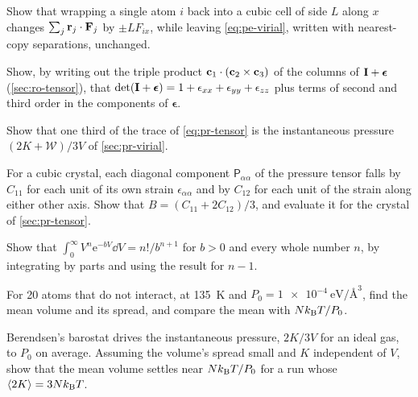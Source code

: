 \begin{exercise}
\label{ex:pr-wrap}
Show that wrapping a single atom $i$ back into a cubic cell of side $L$
along $x$ changes $\sum_j\bm{\mathrm{r}}_j\cdot\bm{\mathrm{F}}_j$ by $\pm LF_{ix}$, while
leaving \cref{eq:pe-virial}, written with nearest-copy separations,
unchanged.
\end{exercise}

\begin{exercise}
\label{ex:pr-det}
Show, by writing out the triple product $\bm{\mathrm{c}}_1\cdot(\bm{\mathrm{c}}_2\times
\bm{\mathrm{c}}_3)$ of the columns of $\bm{\mathrm{I}} + \boldsymbol{\epsilon}$
(\cref{sec:ro-tensor}), that $\det(\bm{\mathrm{I}} + \boldsymbol{\epsilon}) = 1 +
\epsilon_{xx} + \epsilon_{yy} + \epsilon_{zz}$ plus terms of second and
third order in the components of $\boldsymbol{\epsilon}$.
\end{exercise}

\begin{exercise}
\label{ex:pr-trace}
Show that one third of the trace of \cref{eq:pr-tensor} is the
instantaneous pressure $(2K + \mathcal{W})/3V$ of \cref{sec:pr-virial}.
\end{exercise}

\begin{exercise}
\label{ex:pr-cubic}
For a cubic crystal, each diagonal component $\mathsf{P}_{\alpha\alpha}$ of
the pressure tensor falls by $C_{11}$ for each unit of its own strain
$\epsilon_{\alpha\alpha}$ and by $C_{12}$ for each unit of the strain along
either other axis. Show that $B = (C_{11} + 2C_{12})/3$, and evaluate it
for the crystal of \cref{sec:pr-tensor}.
\end{exercise}

\begin{exercise}
\label{ex:pr-gamma}
Show that $\int_0^\infty V^n\mathrm{e}^{-bV}\dd V = n!/b^{n+1}$ for $b > 0$
and every whole number $n$, by integrating by parts and using the result
for $n - 1$.
\end{exercise}

\begin{exercise}
\label{ex:pr-ideal}
For 20 atoms that do not interact, at \SI{135}{\kelvin} and $P_0 =
\SI{1e-4}{\electronvolt\per\angstrom\cubed}$, find the mean volume and its
spread, and compare the mean with $Nk_{\mathrm{B}} T/P_0$.
\end{exercise}

\begin{exercise}
\label{ex:pr-berendsen-mean}
Berendsen's barostat drives the instantaneous pressure, $2K/3V$ for an
ideal gas, to $P_0$ on average. Assuming the volume's spread small and $K$
independent of $V$, show that the mean volume settles near $Nk_{\mathrm{B}} T/P_0$ for
a run whose $\langle 2K \rangle = 3Nk_{\mathrm{B}} T$.
\end{exercise}

